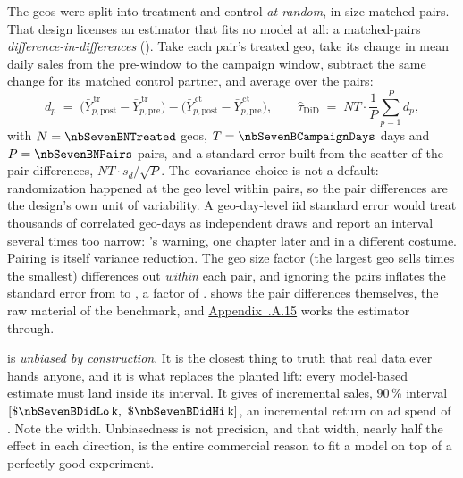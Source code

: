 The \nbSevenBNGeos{} geos were split into treatment and control \emph{at random}, in
\nbSevenBNPairs{} size-matched pairs. That design licenses an estimator that fits no model at
all: a matched-pairs \emph{difference-in-differences} (). Take each pair's treated geo,
take its change in mean daily sales from the pre-window to the
campaign window, subtract the same change for its matched control partner, and average over the
pairs:
%
\begin{equation}
  d_p \;=\; \big(\bar Y^{\,\text{tr}}_{p,\text{post}} - \bar Y^{\,\text{tr}}_{p,\text{pre}}\big)
          - \big(\bar Y^{\,\text{ct}}_{p,\text{post}} - \bar Y^{\,\text{ct}}_{p,\text{pre}}\big),
  \qquad
  \hat\tau_{\text{DiD}} \;=\; N T \cdot \frac{1}{P}\sum_{p=1}^{P} d_p ,
  \label{eq:sc:did}
\end{equation}
%
with $N = \nbSevenBNTreated$ geos, $T = \nbSevenBCampaignDays$ days and $P = \nbSevenBNPairs$
pairs, and a standard error built from the scatter of the pair differences,
$NT \cdot s_d / \sqrt{P}$. The covariance choice is not a default: randomization happened at the
geo level within pairs, so the pair differences are the design's own unit of variability. A
geo-day-level iid standard error would treat thousands of correlated geo-days as independent
draws and report an interval several times too narrow: \citeauthor{bertrand2004}'s warning,
one chapter later and in a different costume. Pairing is itself variance reduction. The geo size
factor (the largest geo sells \nbSevenBSizeRatio{} times the smallest) differences out
\emph{within} each pair, and ignoring the pairs inflates the standard error from
\kusd{\nbSevenBDidSe} to \kusd{\nbSevenBUnpairedSe}, a factor of \nbSevenBPairingGain{}.
 shows the pair differences themselves, the raw material of the benchmark,
and \hyperref[app:sc:pairs]{Appendix~\thechapter.A.15} works the estimator through.



 is \emph{unbiased by construction}. It is the closest thing to truth that real
data ever hands anyone, and it is what replaces the planted lift: every model-based estimate must
land inside its interval. It gives \kusd{\nbSevenBDidTotal} of incremental sales, 90\,\% interval
$[\kusd{\nbSevenBDidLo},\ \kusd{\nbSevenBDidHi}]$, an incremental return on ad spend of
\nbSevenBDidIroas{}. Note the width. Unbiasedness is not precision, and that width, nearly
half the effect in each direction, is the entire commercial reason to fit a model on top of a
perfectly good experiment.

